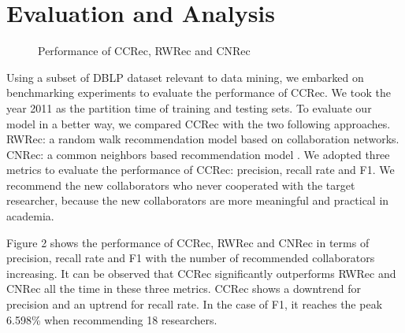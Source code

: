 \documentclass{acm_proc_article-sp}
\begin{document}
\section{Evaluation and Analysis}
\begin{figure}
\centering
{}
\caption{Performance of CCRec, RWRec and CNRec}
\label{fig:5}       %
\end{figure}
Using a subset of DBLP dataset relevant to data mining, we embarked on benchmarking experiments to evaluate the performance of CCRec. We took the year 2011 as the partition time of training and testing sets. To evaluate our model in a better way, we compared CCRec with the two following approaches. RWRec: a random walk recommendation model based on collaboration networks. CNRec: a common neighbors based recommendation model \cite{lopes2010collaboration}. We adopted three metrics to evaluate the performance of CCRec: precision, recall rate and F1. We recommend the new collaborators who never cooperated with the target researcher, because the new collaborators are more meaningful and practical in academia.

Figure 2 shows the performance of CCRec, RWRec and CNRec in terms of precision, recall rate and F1 with the number of recommended collaborators increasing. It can be observed that CCRec significantly outperforms RWRec and CNRec all the time in these three metrics. CCRec shows a downtrend for precision and an uptrend for recall rate. In the case of F1, it reaches the peak 6.598\% when recommending 18 researchers.
\end{document}
